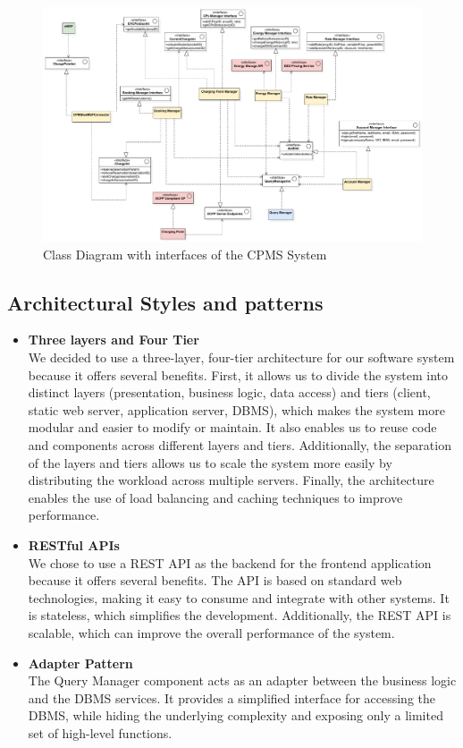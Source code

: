 \begin{figure}[H]
    \centering
    \hspace*{-2.5cm}
    \includegraphics[scale=0.5]{src/componentInterfaces/cpms_interface.pdf}
    \caption{Class Diagram with interfaces of the CPMS System}
\end{figure}

\subsection{Architectural Styles and patterns}
\begin{itemize}
    \item \textbf{Three layers and Four Tier}\\
          We decided to use a three-layer, four-tier architecture for our software system because it offers several benefits. First, it allows us to divide the system into distinct layers (presentation, business logic, data access) and tiers (client, static web server, application server, DBMS), which makes the system more modular and easier to modify or maintain. It also enables us to reuse code and components across different layers and tiers. Additionally, the separation of the layers and tiers allows us to scale the system more easily by distributing the workload across multiple servers. Finally, the architecture enables the use of load balancing and caching techniques to improve performance.
    \item \textbf{RESTful APIs}\\
          We chose to use a REST API as the backend for the frontend application because it offers several benefits. The API is based on standard web technologies, making it easy to consume and integrate with other systems. It is stateless, which simplifies the development. Additionally, the REST API is scalable, which can improve the overall performance of the system.
    \item \textbf{Adapter Pattern}\\
          The Query Manager component acts as an adapter between the business logic and the DBMS services. It provides a simplified interface for accessing the DBMS, while hiding the underlying complexity and exposing only a limited set of high-level functions.
\end{itemize}
